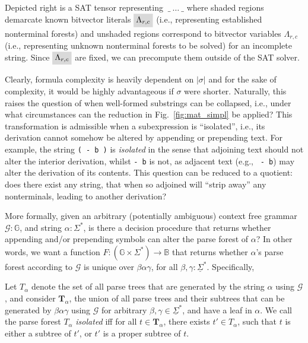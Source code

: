 \documentclass[sigplan,review,anonymous,acmsmall]{acmart}\settopmatter{printfolios=false,printccs=false,printacmref=false}
\begin{document}
Depicted right is a SAT tensor representing $\:\_\:\ldots\:\_$ where shaded regions demarcate known bitvector literals $\highlight{\Lambda_{r,c}}$ (i.e., representing established nonterminal forests) and unshaded regions correspond to bitvector variables $\Lambda_{r,c}$ (i.e., representing unknown nonterminal forests to be solved) for an incomplete string. Since $\highlight{\Lambda_{r,c}}$ are fixed, we can precompute them outside of the SAT solver.

Clearly, formula complexity is heavily dependent on $|\sigma|$ and for the sake of complexity, it would be highly advantageous if $\sigma$ were shorter. Naturally, this raises the question of when well-formed substrings can be collapsed, i.e., under what circumstances can the reduction in Fig.~\ref{fig:mat_simpl} be applied? This transformation is admissible when a subexpression is ``isolated'', i.e., its derivation cannot somehow be altered by appending or prepending text. For example, the string \texttt{( - b )} is \textit{isolated} in the sense that adjoining text should not alter the interior derivation, whilst \texttt{- b} is not, as adjacent text (e.g., \texttt{ - b}) may alter the derivation of its contents. This question can be reduced to a quotient: does there exist any string, that when so adjoined will ``strip away'' any nonterminals, leading to another derivation?

More formally, given an arbitrary (potentially ambiguous) context free grammar $\mathcal{G}: \mathbb{G}$, and string $\alpha: \Sigma^*$, is there a decision procedure that returns whether appending and/or prepending symbols can alter the parse forest of $\alpha$? In other words, we want a function $F: (\mathbb{G} \times \Sigma^*) \rightarrow \mathbb{B}$ that returns whether $\alpha$'s parse forest according to $\mathcal{G}$ is unique over $\beta\alpha\gamma$, for all $\beta, \gamma: \underline\Sigma^*$. Specifically,

\begin{definition}[Isolation]\label{def:isolation}
Let $T_\alpha$ denote the set of all parse trees that are generated by the string $\alpha$ using $\mathcal{G}$, and consider $\mathbf{T}_{\alpha}$, the union of all parse trees and their subtrees that can be generated by $\beta\alpha\gamma$ using $\mathcal{G}$ for arbitrary $\beta, \gamma \in \underline\Sigma^*$, and have a leaf in $\alpha$. We call the parse forest $T_\alpha$ \textit{isolated} iff for all $t \in \mathbf{T}_{\alpha}$, there exists $t' \in T_\alpha$, such that $t$ is either a subtree of $t'$, or $t'$ is a proper subtree of $t$.
\end{definition}
\end{document}
